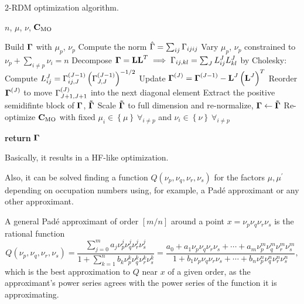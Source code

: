 \begin{algorithm}
    \caption{2-RDM optimization algorithm.}\label{al:2rdm-opt}
    \begin{algorithmic}[1]
        \Require $n$, $\mu$, $\nu$, $ \boldsymbol{\mathrm{C}}_{\text{MO}}$

        \State Build $ \boldsymbol{\mathrm{\Gamma}}$ with $\mu_p$, $\nu_p$
        \State Compute the norm $ \hat{\Gamma} = \sum_{ij} \Gamma_{ijij} $
        \State Vary $\mu_p$, $\nu_p$ constrained to $ \nu_p + \sum_{i \not= p} \nu_i = n$
        \EndWhile
        \State Decompose 
        $\boldsymbol{\mathrm{\Gamma}} = \boldsymbol{\mathrm{L}} \boldsymbol{\mathrm{L}}^{T} \implies \Gamma_{ij,kl} = \sum_{J} L_{ij}^{J} L_{kl}^{J}$
        by Cholesky:
        \State Compute $L_{ij}^{J} = \Gamma_{ij,J}^{\left( J-1 \right)} \left( \Gamma_{J,J}^{\left( J-1 \right)} \right)^{-1 /2}$
        \State Update $ \boldsymbol{\mathrm{\Gamma}}^{\left( J \right)} = \boldsymbol{\mathrm{\Gamma}}^{\left( J-1 \right)} - \boldsymbol{\mathrm{L}}^{J} \left( \boldsymbol{\mathrm{L}}^{J} \right)^{T}$
        \State Reorder $ \boldsymbol{\mathrm{\Gamma}}^{\left( J \right)}$ to move
        $\Gamma_{J+1,J+1}^{\left( J \right)}$ into the next diagonal
        element
        \EndIf
        \EndFor
        \State Extract the positive semidifinte block of $ \boldsymbol{\mathrm{\Gamma}}$, $ \boldsymbol{\mathrm{\tilde{\Gamma}}}$
        \State Scale $ \boldsymbol{\mathrm{\tilde{\Gamma}}}$ to full dimension and re-normalize, $ \boldsymbol{\mathrm{\Gamma}} \leftarrow \boldsymbol{\mathrm{\tilde{\Gamma}}}$
        \State Re-optimize $ \boldsymbol{\mathrm{C}}_{\text{MO}}$ with fixed 
        $\mu_i \in \left\{ \mu \right\}\ \forall_{i \not= p}$
        and
        $\nu_i \in \left\{ \nu \right\}\ \forall_{i \not= p}$
        \EndFor

        \State \textbf{return} $ \boldsymbol{\mathrm{\Gamma}}$
    \end{algorithmic}
\end{algorithm}

Basically, it results in a HF-like optimization.


Also, it can be solved finding a function 
$Q\left( \nu_p, \nu_q, \nu_r, \nu_s \right)$ for the factors $\mu,\mu^{\prime}$
depending on occupation numbers using, for example,
a Padé approximant or any other approximant.

A general Padé approximant of order $\left[ m / n \right]$ around a point 
$x=\nu_p \nu_q \nu_r \nu_s$ is the rational function 
\begin{equation}
    Q\left( \nu_p, \nu_q, \nu_r, \nu_s \right) =
    \frac{
        \sum_{j = 0}^{m} a_j \nu_p^{j} \nu_q^{j} \nu_r^{j} \nu_s^{j}
    }{
        1 + \sum_{k=1}^{n} b_k \nu_p^{k} \nu_q^{k} \nu_r^{k} \nu_s^{k}
    } =
    \frac{
        a_0 + a_1 \nu_p \nu_q \nu_r \nu_s + \cdots + a_m \nu_p^{m} \nu_q^{m} \nu_r^{m} \nu_s^{m}
    }{
        1 + b_1 \nu_p \nu_q \nu_r \nu_s + \cdots + b_n \nu_p^{n} \nu_q^{n} \nu_r^{n} \nu_s^{n}
    }
    ,
\end{equation}
which is the best approximation to $Q$ near $x$ of a given order, as
the approximant's power series agrees with the power series of the function
it is approximating.


